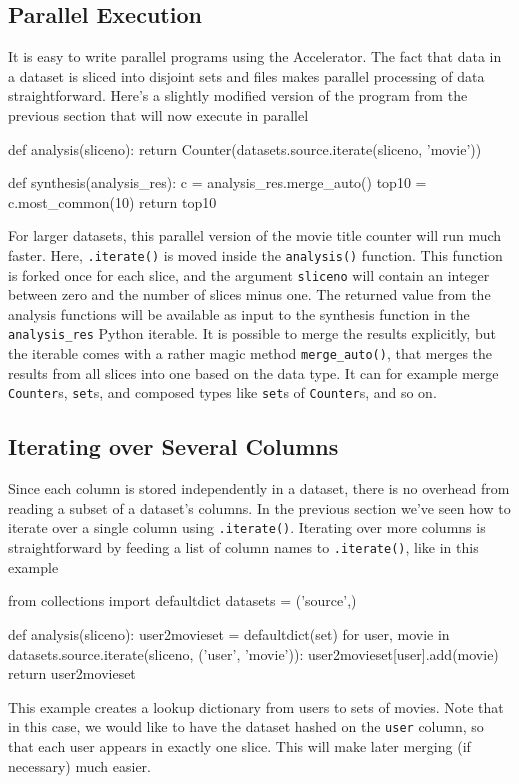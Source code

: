 \subsection{Parallel Execution}
It is easy to write parallel programs using the Accelerator.  The fact
that data in a dataset is sliced into disjoint sets and files makes
parallel processing of data straightforward.  Here's a slightly
modified version of the program from the previous section that will
now execute in parallel
\begin{python}
def analysis(sliceno):
    return Counter(datasets.source.iterate(sliceno, 'movie'))

def synthesis(analysis_res):
    c = analysis_res.merge_auto()
    top10 = c.most_common(10)
    return top10
\end{python}
For larger datasets, this parallel version of the movie title counter
will run much faster.  Here, \texttt{.iterate()} is moved inside the
\texttt{analysis()} function.  This function is forked once for each
slice, and the argument \texttt{sliceno} will contain an integer
between zero and the number of slices minus one.  The returned value
from the analysis functions will be available as input to the
synthesis function in the \texttt{analysis\_res} Python iterable.  It
is possible to merge the results explicitly, but the iterable
comes with a rather magic method \texttt{merge\_auto()}, that merges
the results from all slices into one based on the data type.  It can
for example merge \texttt{Counter}s, \texttt{set}s, and composed types
like \texttt{set}s of \texttt{Counter}s, and so on.


\subsection{Iterating over Several Columns}
Since each column is stored independently in a dataset, there is no
overhead from reading a subset of a dataset's columns.  In the
previous section we've seen how to iterate over a single column using
\texttt{.iterate()}.  Iterating over more columns is straightforward
by feeding a list of column names to \texttt{.iterate()}, like in this
example
\begin{python}
from collections import defaultdict
datasets = ('source',)

def analysis(sliceno):
    user2movieset = defaultdict(set)
    for user, movie in datasets.source.iterate(sliceno, ('user', 'movie')):
        user2movieset[user].add(movie)
    return user2movieset
\end{python}
This example creates a lookup dictionary from users to sets of movies.
Note that in this case, we would like to have the dataset hashed on
the \texttt{user} column, so that each user appears in exactly one slice.
This will make later merging (if necessary) much easier.


